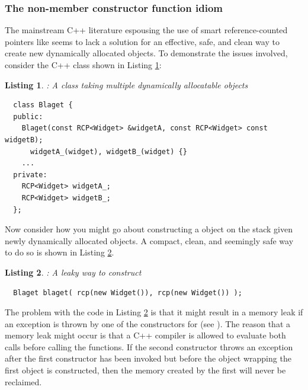 \documentclass[pdf,ps2pdf,11pt]{SANDreport}
\newtheorem{listing}{Listing}
\begin{document}
%
{}\subsubsection{The non-member constructor function idiom}
\label{sec:nonmember-constructor-idiom}
%

The mainstream C++ literature espousing the use of smart
reference-counted pointers like {} seems to
lack a solution for an effective, safe, and clean way to create new
dynamically allocated objects.  To demonstrate the issues involved,
consider the C++ class {} shown in Listing
{}\ref{listing:BlagetClass}:

\begin{listing}: A class taking multiple dynamically allocatable objects \\
\label{listing:BlagetClass}
{\small\begin{verbatim}
  class Blaget {
  public:
    Blaget(const RCP<Widget> &widgetA, const RCP<Widget> const widgetB);
      widgetA_(widget), widgetB_(widget) {}
    ...
  private:
    RCP<Widget> widgetA_;
    RCP<Widget> widgetB_;
  };
\end{verbatim}}
\end{listing}

Now consider how you might go about constructing a {}
object on the stack given newly dynamically allocated
{} objects.  A compact, clean, and seemingly safe way
to do so is shown in Listing {}\ref{listing:BlagetConstruct1}.

\begin{listing}: A leaky way to construct \\
\label{listing:BlagetConstruct1}
{\small\begin{verbatim}
  Blaget blaget( rcp(new Widget()), rcp(new Widget()) );
\end{verbatim}}
\end{listing}

The problem with the code in Listing {}\ref{listing:BlagetConstruct1}
is that it might result in a memory leak if an exception is thrown by
one of the constructors for {} (see {}\cite[Item
13]{C++CodingStandards05}).  The reason that a memory leak might occur
is that a C++ compiler is allowed to evaluate both {} calls before calling the {} functions.
If the second constructor {} throws an exception
after the first {} constructor has been invoked
but before the {} object wrapping the first
{} object is constructed, then the memory created by
the first {} will never be reclaimed.
\end{document}
